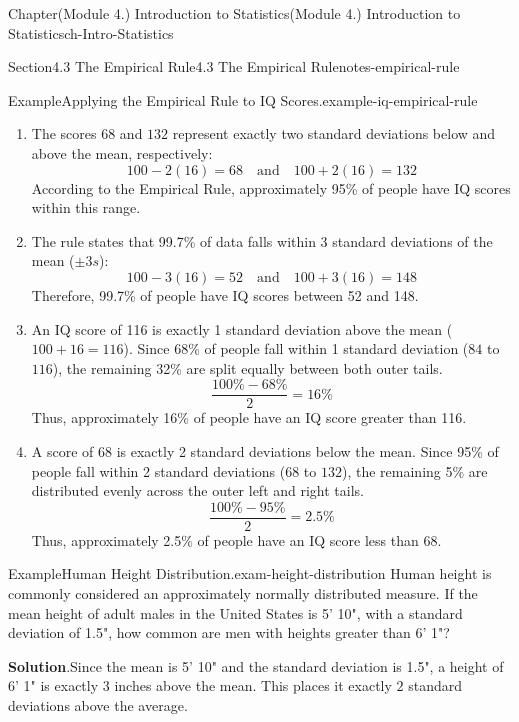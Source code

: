 \documentclass[oneside,10pt,]{book}
\newcommand{\blocktitlefont}{\relax}
\begin{document}
\begin{chapterptx}{Chapter}{(Module 4.) Introduction to Statistics}{}{(Module 4.) Introduction to Statistics}{}{}{ch-Intro-Statistics}
\begin{sectionptx}{Section}{4.3 The Empirical Rule}{}{4.3 The Empirical Rule}{}{}{notes-empirical-rule}
\begin{example}{Example}{Applying the Empirical Rule to IQ Scores.}{example-iq-empirical-rule}
\par
%
\begin{enumerate}[label={\arabic*}]
\item{}The scores \(68\) and \(132\) represent exactly two standard deviations below and above the mean, respectively:%
\begin{equation*}
100 - 2(16) = 68 \quad \text{and} \quad 100 + 2(16) = 132
\end{equation*}
According to the Empirical Rule, approximately 95\% of people have IQ scores within this range.%
\item{}The rule states that 99.7\% of data falls within 3 standard deviations of the mean (\(\pm 3s\)):%
\begin{equation*}
100 - 3(16) = 52 \quad \text{and} \quad 100 + 3(16) = 148
\end{equation*}
Therefore, 99.7\% of people have IQ scores between 52 and 148.%
\item{}An IQ score of 116 is exactly 1 standard deviation above the mean (\(100 + 16 = 116\)). Since 68\% of people fall within 1 standard deviation (\(84\) to \(116\)), the remaining 32\% are split equally between both outer tails.%
\begin{equation*}
\frac{100\% - 68\%}{2} = 16\%
\end{equation*}
Thus, approximately 16\% of people have an IQ score greater than 116.%
\item{}A score of 68 is exactly 2 standard deviations below the mean. Since 95\% of people fall within 2 standard deviations (\(68\) to \(132\)), the remaining 5\% are distributed evenly across the outer left and right tails.%
\begin{equation*}
\frac{100\% - 95\%}{2} = 2.5\%
\end{equation*}
Thus, approximately 2.5\% of people have an IQ score less than 68.%
\end{enumerate}
%
\end{example}
\begin{example}{Example}{Human Height Distribution.}{exam-height-distribution}%
Human height is commonly considered an approximately normally distributed measure. If the mean height of adult males in the United States is 5' 10", with a standard deviation of 1.5", how common are men with heights greater than 6' 1"?%
\par\smallskip%
\noindent\textbf{\blocktitlefont Solution}.\hypertarget{exam-height-distribution-3}{}\quad{}Since the mean is 5' 10" and the standard deviation is 1.5", a height of 6' 1" is exactly 3 inches above the mean. This places it exactly \(2\) standard deviations above the average.%

\end{example}
\end{sectionptx}
\end{chapterptx}
\end{document}
